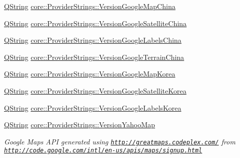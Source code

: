 \begin{DoxyCompactItemize}
\item 
\hyperlink{group___u_a_v_objects_plugin_gab9d252f49c333c94a72f97ce3105a32d}{Q\-String} \hyperlink{group___o_p_map_widget_gae854c1eca4887d3d875bc5f26ace02f2}{core\-::\-Provider\-Strings\-::\-Version\-Google\-Map\-China}
\item 
\hyperlink{group___u_a_v_objects_plugin_gab9d252f49c333c94a72f97ce3105a32d}{Q\-String} \hyperlink{group___o_p_map_widget_ga9305b4a54fb603c540a9a8c268a097ec}{core\-::\-Provider\-Strings\-::\-Version\-Google\-Satellite\-China}
\item 
\hyperlink{group___u_a_v_objects_plugin_gab9d252f49c333c94a72f97ce3105a32d}{Q\-String} \hyperlink{group___o_p_map_widget_ga702737218086c22a41d6dfaeb6092644}{core\-::\-Provider\-Strings\-::\-Version\-Google\-Labels\-China}
\item 
\hyperlink{group___u_a_v_objects_plugin_gab9d252f49c333c94a72f97ce3105a32d}{Q\-String} \hyperlink{group___o_p_map_widget_gad75c975b2a7aeefd01f65c78e701394b}{core\-::\-Provider\-Strings\-::\-Version\-Google\-Terrain\-China}
\item 
\hyperlink{group___u_a_v_objects_plugin_gab9d252f49c333c94a72f97ce3105a32d}{Q\-String} \hyperlink{group___o_p_map_widget_ga3487c2fed1d7acaa4c9d34e8b4afd9de}{core\-::\-Provider\-Strings\-::\-Version\-Google\-Map\-Korea}
\item 
\hyperlink{group___u_a_v_objects_plugin_gab9d252f49c333c94a72f97ce3105a32d}{Q\-String} \hyperlink{group___o_p_map_widget_ga33344ab29672c4dcedd40642df473969}{core\-::\-Provider\-Strings\-::\-Version\-Google\-Satellite\-Korea}
\item 
\hyperlink{group___u_a_v_objects_plugin_gab9d252f49c333c94a72f97ce3105a32d}{Q\-String} \hyperlink{group___o_p_map_widget_ga4f4a5781537c7ee429695a130c8ccbdb}{core\-::\-Provider\-Strings\-::\-Version\-Google\-Labels\-Korea}
\item 
\hyperlink{group___u_a_v_objects_plugin_gab9d252f49c333c94a72f97ce3105a32d}{Q\-String} \hyperlink{group___o_p_map_widget_ga3846cf6d2412f72a3c10be8d4066f7fc}{core\-::\-Provider\-Strings\-::\-Version\-Yahoo\-Map}
\begin{DoxyCompactList}\small\item\em Google Maps A\-P\-I generated using \href{http://greatmaps.codeplex.com/}{\tt http\-://greatmaps.\-codeplex.\-com/} from \href{http://code.google.com/intl/en-us/apis/maps/signup.html}{\tt http\-://code.\-google.\-com/intl/en-\/us/apis/maps/signup.\-html} \end{DoxyCompactList}\item 

\end{DoxyCompactItemize}
